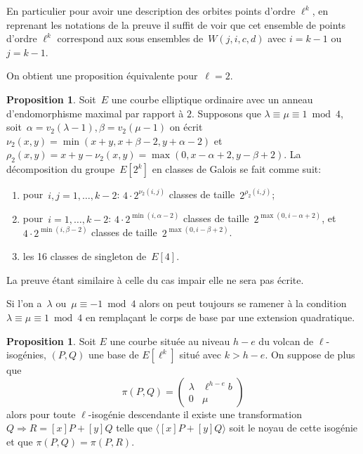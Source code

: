 \documentclass[10pt,a4paper]{book}
\theoremstyle{plain}
\theoremstyle{definition}
\theoremstyle{definition}
\theoremstyle{definition}
\newtheorem{prop}[thm]{Proposition}
\theoremstyle{definition}
\theoremstyle{remark}
\theoremstyle{remark}
\theoremstyle{definition}
\begin{document}
En particulier pour avoir une description des orbites points d'ordre $\ell^k$, en reprenant les notations de la preuve il suffit de voir que cet ensemble de points d'ordre $\ell^k$ correspond aux sous ensembles de~$W(j,i,c,d)$ avec $i=k-1$ ou $j=k-1$. 

On obtient une proposition équivalente pour~$\ell = 2$.


\begin{prop}\label{prop:orbites-2-torsion}
Soit~$E$ une courbe elliptique ordinaire avec un anneau d'endomorphisme maximal
 par rapport à $2$.
Supposons que $\lambda \equiv \mu \equiv 1 \bmod4 $, soit~$\alpha = v_2(\lambda-1), \beta=v_2(\mu-1)$
on écrit~$\nu_2(x, y) = \min (x+y, x+\beta-2, y+\alpha-2)$
et~$\rho_2(x, y) = x+y - \nu_2(x, y) = \max (0, x-\alpha+2, y-\beta+2)$.
La décomposition du groupe~$E[2^k]$ en classes de Galois se fait comme suit:
\begin{enumerate}
\item pour~$i, j = 1, …, k-2$:
$4 \cdot 2^{\nu_2(i,j)}$ classes de taille~$2^{\rho_2(i,j)}$;
\item pour~$i = 1, …, k-2$:
$4 \cdot 2^{\min (i, \alpha-2)}$ classes de taille~$2^{\max (0, i-\alpha+2)}$, et
$4 \cdot 2^{\min (i, \beta-2)}$ classes de taille~$2^{\max (0, i-\beta+2)}$.
\item les 16 classes de singleton de~$E[4]$.
\end{enumerate}
\end{prop}
La preuve étant similaire à celle du cas impair elle ne sera pas écrite.

Si l'on a~$\lambda$ ou~$\mu \equiv -1 \bmod 4$ alors
on peut toujours se ramener à la condition $\lambda \equiv \mu \equiv 1 \bmod 4$
en remplaçant le corps de base par une extension quadratique.

\begin{prop}
Soit $E$ une courbe située au niveau $h-e$ du volcan de $\ell$-isogénies, 
$(P,Q)$ une base de $E[\ell^k]$ situé avec $k>h-e$. On suppose de plus que
\[
\pi(P,Q)=\left( \begin{matrix}
\lambda & \ell^{h-e}b \\
0 & \mu
\end{matrix} \right)
\] alors pour toute $\ell$-isogénie descendante il existe une transformation 
$Q \Rightarrow R=[x]P+[y]Q$ telle que $\langle [x]P+[y]Q \rangle$ soit le noyau 
de cette isogénie et que $\pi(P,Q)=\pi(P,R)$. 
\end{prop}
\end{document}
